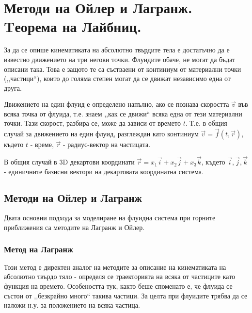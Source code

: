 \section{Методи на Ойлер и Лагранж. Tеорема на Лайбниц.}
За да се опише кинематиката на абсолютно твърдите тела е достатъчно да е известно движението на три негови точки. Флуидите обаче, не могат да бъдат описани така. Това е защото
те са състваени от континиум от материални точки (,,частици``), които до голяма степен могат да се движат независимо една от друга.

Движението на един флуид е определено напълно, ако се познава скоростта $\vec{v}$ във всяка точка от флуида, т.е. знаем ,,как се движи`` всяка една от тези материални точки.
Тази скорост, разбира се, може да зависи от времето $t$. Т.е. в общия случай за движението на един флуид, разглеждан като континиум $\vec{v} = \vec{f}(t,\vec{r})$, където $t$ - време,
$\vec{r}$ - радиус-вектор на частицата.

В общия случай в 3D декартови координати $\vec{r} = x_1 \vec{i} + x_2 \vec{j} + x_3 \vec{k}$, където $\vec{i}, \vec{j}, \vec{k}$ - единичните базисни вектори на декартовата координатна система.
\subsection{Методи на Ойлер и Лагранж}
Двата основни подхода за моделиране на флуидна система при горните приближения са методите на Лагранж и Ойлер.
\subsubsection{Метод на Лагранж}
Този метод е директен аналог на методите за описание на кинематиката на абсолютно твърдо тяло - определя се траекторията на всяка от частиците като функция на времето. Особеността  тук, както беше споменато е,
че флуида се състои от ,,безкрайно много`` такива частици. За целта при флуидите трябва да се наложи н.у. за положението на всяка частица.

